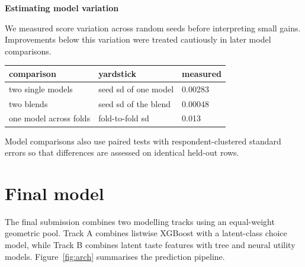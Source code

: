 \documentclass[11pt]{article}
\begin{document}
\smallskip
\noindent\textbf{Estimating model variation}\par
We measured score variation across random seeds before interpreting small gains.
Improvements below this variation were treated cautiously in later model comparisons.

\begin{center}\small
\begin{tabular}{lll}
\toprule
comparison & yardstick & measured \\
\midrule
two single models & seed sd of one model & 0.00283 \\
two blends & seed sd of the blend & 0.00048 \\
one model across folds & fold-to-fold sd & 0.013 \\
\bottomrule
\end{tabular}
\end{center}

\noindent Model comparisons also use paired tests with respondent-clustered standard
errors so that differences are assessed on identical held-out rows.

\section{Final model}\label{sec:model}

The final submission combines two modelling tracks using an
equal-weight geometric pool. Track A combines listwise XGBoost with a latent-class choice
model, while Track B combines latent taste features with tree and neural utility models.
Figure~\ref{fig:arch} summarises the prediction pipeline.
\end{document}
